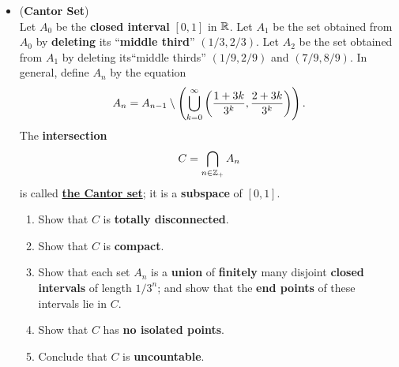 \documentclass[11pt]{article}
\begin{document}
\begin{itemize}
\item \begin{exercise} (\textbf{Cantor Set}) \citep{munkres2000topology}\\
Let $A_0$ be the \textbf{closed interval} $[0, 1]$ in ${\mathbb R}$. Let $A_1$ be the set obtained from $A_0$ by \textbf{deleting} its ``\textbf{middle third}” $(1/3, 2/3)$. Let $A_2$ be the set obtained from $A_1$ by deleting its``middle thirds” $(1/9, 2/9)$ and $(7/9, 8/9)$. In general, define $A_n$ by the equation
\begin{align*}
A_n = A_{n-1} \setminus \left(\bigcup_{k=0}^{\infty}\left(\frac{1 + 3k}{3^k}, \frac{2 + 3k}{3^k}\right)\right).
\end{align*}
The \textbf{intersection}
\begin{align*}
C = \bigcap_{n \in {\mathbb Z}_{+}}A_n
\end{align*}
is called \underline{\textbf{the Cantor set}}; it is a \textbf{subspace} of $[0, 1]$.
\begin{enumerate}
\item Show that $C$ is \textbf{totally disconnected}.
\item Show that $C$ is \textbf{compact}.
\item Show that each set $A_n$ is a \textbf{union} of \textbf{finitely} many disjoint \textbf{closed intervals} of
length $1/3^n$; and show that the \textbf{end points} of these intervals lie in $C$.
\item Show that $C$ has \textbf{no isolated points}.
\item Conclude that $C$ is \textbf{uncountable}.
\end{enumerate}
\end{exercise}

\end{itemize}
\end{document}
